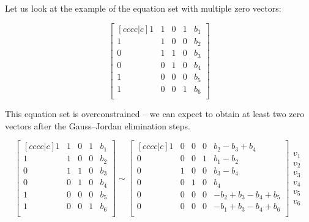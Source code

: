 Let us look at the example of the equation set with multiple zero vectors:

\begin{equation}
\begin{bmatrix}[cccc|c]
    1 & 1 & 0 & 1 & b_1 \\
    1 & 1 & 0 & 0 & b_2 \\
    0 & 1 & 1 & 0 & b_3 \\ 
    0 & 0 & 1 & 0 & b_4 \\ 
    1 & 0 & 0 & 0 & b_5 \\ 
    1 & 0 & 0 & 1 & b_6 \\ 
\end{bmatrix}
\end{equation}

This equation set is overconstrained -- we can expect to obtain at least two zero vectors after the Gauss--Jordan elimination steps.

\begin{equation}
\begin{bmatrix}[cccc|c]
    1 & 1 & 0 & 1 & b_1 \\
    1 & 1 & 0 & 0 & b_2 \\
    0 & 1 & 1 & 0 & b_3 \\ 
    0 & 0 & 1 & 0 & b_4 \\ 
    1 & 0 & 0 & 0 & b_5 \\ 
    1 & 0 & 0 & 1 & b_6 \\ 
\end{bmatrix} \sim
\begin{bmatrix}[cccc|c]
    1 & 0 & 0 & 0 & b_2 - b_3 + b_4 \\
    0 & 0 & 0 & 1 & b_1 - b_2 \\
    0 & 1 & 0 & 0 & b_3 - b_4 \\ 
    0 & 0 & 1 & 0 & b_4 \\ 
    0 & 0 & 0 & 0 & -b_2 + b_3 - b_4 + b_5 \\ 
    0 & 0 & 0 & 0 & -b_1 + b_3 - b_4 + b_6 \\ 
\end{bmatrix}
\begin{matrix}
v_1 \\ v_2 \\ v_3 \\ v_4 \\ v_5 \\ v_6
\end{matrix}
\label{eq:gauss_jordan1}
\end{equation}

